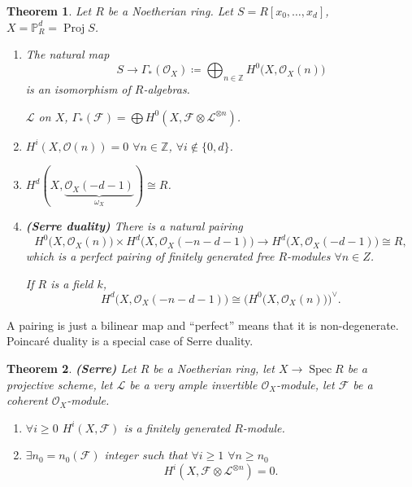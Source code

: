 \documentclass[12pt]{article}
\DeclareMathOperator{\Spec}{Spec}
\DeclareMathOperator{\Proj}{Proj}
\newtheorem*{theorem}{Theorem}
\theoremstyle{definition}
\begin{document}
\begin{theorem}
Let $R$ be a Noetherian ring. Let $S=R[x_0,\ldots,x_d]$, $X=\mathbb P_R^d=\Proj S$.

\begin{enumerate}[label=\arabic*)]
\item The natural map
\[S\longrightarrow\Gamma_*(\mathcal O_X)\coloneqq\bigoplus_{n\in\mathbb Z}H^0\big(X,\mathcal O_X(n)\big)\]
is an isomorphism of $R$-algebras.

$\mathcal L$ on $X$, $\Gamma_*(\mathcal F)=\bigoplus H^0(X,\mathcal F\otimes\mathcal L^{\otimes n})$.

\item $H^i(X,\mathcal O(n))=0$ $\forall n\in\mathbb Z$, $\forall i\notin\{0,d\}$.

\item $H^d(X,\underbrace{\mathcal O_X(-d-1)}_{\omega_X})\cong R$.

\item \emph{\textbf{(Serre duality)}} There is a natural pairing
\[H^0\big(X,\mathcal O_X(n)\big)\times H^d(X,\mathcal O_X(-n-d-1)\big)\longrightarrow H^d\big(X,\mathcal O_X(-d-1)\big)\cong R,\]
which is a perfect pairing of finitely generated free $R$-modules $\forall n\in Z$.

If $R$ is a field $k$,
\[H^d\big(X,\mathcal O_X(-n-d-1)\big)\cong\big(H^0\big(X,\mathcal O_X(n)\big)\big)^\vee.\]
\end{enumerate}
\end{theorem}

A pairing is just a bilinear map and ``perfect'' means that it is non-degenerate. Poincar\'e duality is a special case of Serre duality.

\begin{theorem}
\emph{\textbf{(Serre)}} Let $R$ be a Noetherian ring, let $X\rightarrow\Spec R$ be a projective scheme, let $\mathcal L$ be a very ample invertible $\mathcal O_X$-module, let $\mathcal F$ be a coherent $\mathcal O_X$-module.

\begin{enumerate}[label=\arabic*)]
\item $\forall i\geq0$ $H^i(X,\mathcal F)$ is a finitely generated $R$-module.

\item $\exists n_0=n_0(\mathcal F)$ integer such that $\forall i\geq1$ $\forall n\geq n_0$
\[H^i(X,\mathcal F\otimes\mathcal L^{\otimes n})=0.\]
\end{enumerate}
\end{theorem}
\end{document}
